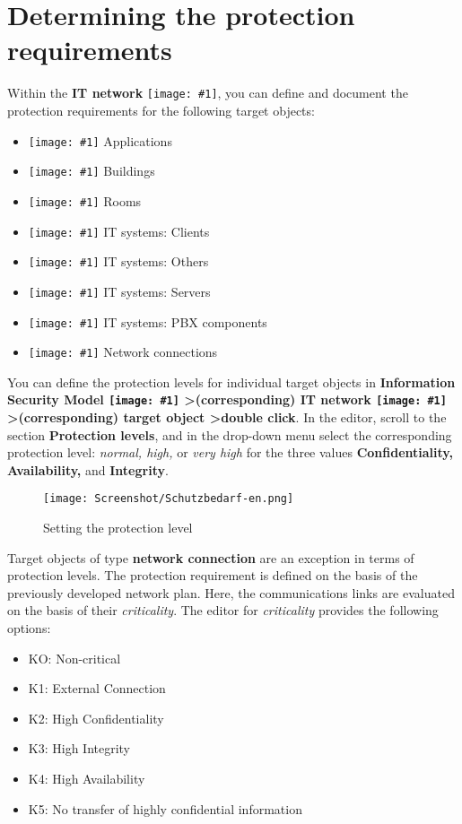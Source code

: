 \documentclass[a4paper,10pt]{book}
\newcommand{\icon}[1]{\texttt{[image: \#1]}}
\begin{document}
\section{Determining the protection requirements}
Within the \textbf{IT network} \icon{Icon/GS_Modell.png},
you can define and document the protection requirements for the following target objects:
\begin{itemize}
 \item \icon{Icon/Anwendung.png} Applications
 \item \icon{Icon/Gebaeude.png} Buildings
 \item \icon{Icon/Raeume.png} Rooms
 \item \icon{Icon/Clients.png} IT systems: Clients
 \item \icon{Icon/Sonstige.png} IT systems: Others
 \item \icon{Icon/Server.png} IT systems: Servers
 \item \icon{Icon/Tk_komponenten.png} IT systems: PBX components
 \item \icon{Icon/Netzwerkverbindungen.png} Network connections
\end{itemize}
You can define the protection levels for individual target objects in
\textbf{Information Security Model \icon{Icon/GS_Modell.png}
\textgreater (corresponding) IT network \icon{Icon/GS_Modell.png}
\textgreater (corresponding) target object \textgreater double click}. In the editor, scroll to the section
\textbf{Protection levels}, and in the drop-down menu select the corresponding protection level:
{\em normal, high,} or {\em very high} for the three values \textbf{Confidentiality, Availability,} and
\textbf{Integrity}.
\newline
\begin{figure}[htb!]
  \centering
  \texttt{[image: Screenshot/Schutzbedarf-en.png]}
  \caption{\label{Setting the protection level} Setting the protection level}
\end{figure}
\newline
Target objects of type \textbf{network connection} are an exception in terms of protection levels.
The protection requirement is defined on the basis of the previously developed network plan.
Here, the communications links are evaluated on the basis of their {\em criticality}. The editor for
{\em criticality} provides the following options:
\begin{itemize}
 \item KO: Non-critical
 \item K1: External Connection
 \item K2: High Confidentiality
 \item K3: High Integrity
 \item K4: High Availability
 \item K5: No transfer of highly confidential information
\end{itemize}
\end{document}

